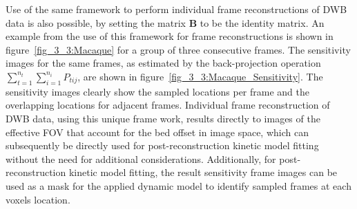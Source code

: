 Use of the same framework to perform individual frame reconstructions of DWB data is also possible, by setting the matrix $\boldsymbol{B}$ to be the identity matrix. 
An example from the use of this framework for frame reconstructions is shown in figure~\ref{fig_3_3:Macaque} for a group of three consecutive frames. The sensitivity images for the same frames, as estimated by the back-projection operation $\sum_{t=1}^{n_t} \sum_{i=1}^{n_i} P_{tij}$, are shown in figure~\ref{fig_3_3:Macaque_Sensitivity}.
The sensitivity images clearly show the sampled locations per frame and the overlapping locations for adjacent frames. 
Individual frame reconstruction of DWB data, using this unique frame work, results directly to images of the effective FOV that account for the bed offset in image space, which can subsequently be directly used for post-reconstruction kinetic model fitting without the need for additional considerations. Additionally, for post-reconstruction kinetic model fitting, the result sensitivity frame images can be used as a mask for the applied dynamic model to identify sampled frames at each voxels location.


